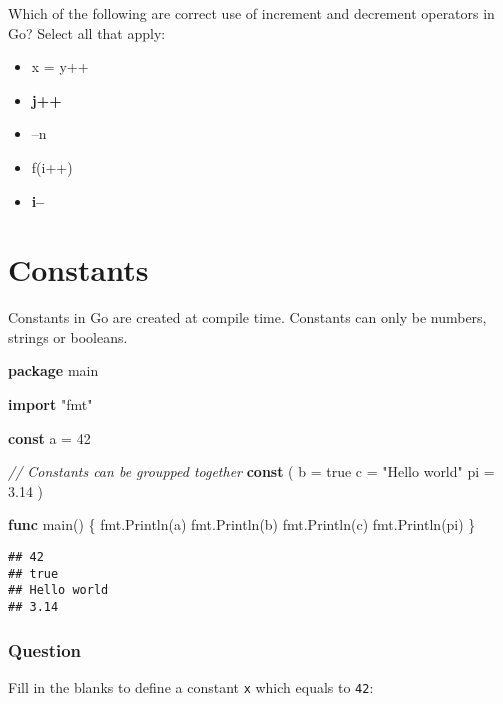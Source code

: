 \documentclass[]{book}
\newenvironment{Shaded}{\begin{snugshade}}{\end{snugshade}}
\newcommand{\CommentTok}[1]{\textcolor[rgb]{0.56,0.35,0.01}{\textit{#1}}}
\newcommand{\DecValTok}[1]{\textcolor[rgb]{0.00,0.00,0.81}{#1}}
\newcommand{\FloatTok}[1]{\textcolor[rgb]{0.00,0.00,0.81}{#1}}
\newcommand{\KeywordTok}[1]{\textcolor[rgb]{0.13,0.29,0.53}{\textbf{#1}}}
\newcommand{\NormalTok}[1]{#1}
\newcommand{\OtherTok}[1]{\textcolor[rgb]{0.56,0.35,0.01}{#1}}
\newcommand{\StringTok}[1]{\textcolor[rgb]{0.31,0.60,0.02}{#1}}
\providecommand{\tightlist}{%
  \setlength{\itemsep}{0pt}\setlength{\parskip}{0pt}}
\begin{document}
Which of the following are correct use of increment and decrement operators in
Go? Select all that apply:

\begin{itemize}
\tightlist
\item
  x = y++
\item
  \textbf{j++}
\item
  --n
\item
  f(i++)
\item
  \textbf{i--}
\end{itemize}

\hypertarget{constants}{%
\section{Constants}\label{constants}}

Constants in Go are created at compile time. Constants can only be numbers,
strings or booleans.

\begin{Shaded}
\begin{Highlighting}[]
\KeywordTok{package}\NormalTok{ main}

\KeywordTok{import} \StringTok{"fmt"}

\KeywordTok{const}\NormalTok{ a = }\DecValTok{42}

\CommentTok{// Constants can be groupped together}
\KeywordTok{const}\NormalTok{ (}
\NormalTok{    b = }\OtherTok{true}
\NormalTok{    c = }\StringTok{"Hello world"}
\NormalTok{    pi = }\DecValTok{3}\FloatTok{.14}
\NormalTok{)}

\KeywordTok{func}\NormalTok{ main() \{}
\NormalTok{    fmt.Println(a)}
\NormalTok{    fmt.Println(b)}
\NormalTok{    fmt.Println(c)}
\NormalTok{    fmt.Println(pi)}
\NormalTok{\}}
\end{Highlighting}
\end{Shaded}

\begin{verbatim}
## 42
## true
## Hello world
## 3.14
\end{verbatim}

\hypertarget{question-14}{%
\subsubsection*{Question}\label{question-14}}

Fill in the blanks to define a constant \texttt{x} which equals to \texttt{42}:
\end{document}
